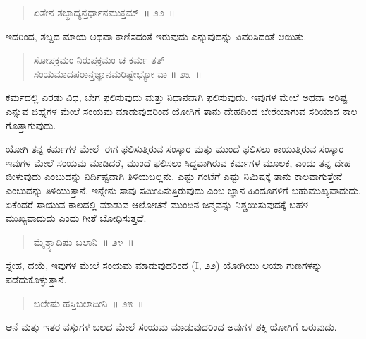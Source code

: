 \vspace{-0.3cm}

\begin{verse}
ಏತೇನ ಶಬ್ಧಾದ್ಯನ್ತರ್ಧಾನಮುಕ್ತಮ್​~॥ ೨೨~॥
\end{verse}

\vspace{-0.3cm}

ಇದರಿಂದ, ಶಬ್ದದ ಮಾಯ ಅಥವಾ ಕಾಣಿಸದಂತೆ ಇರುವುದು ಎನ್ನುವುದನ್ನು ವಿವರಿಸಿದಂತೆ ಆಯಿತು. 

\vspace{-0.3cm}

\begin{verse}
ಸೋಪಕ್ರಮಂ ನಿರುಪಕ್ರಮಂ ಚ ಕರ್ಮ ತತ್​\\ಸಂಯಮಾದಪರಾನ್ತಜ್ಞಾನಮರಿಷ್ಟೇಭ್ಯೋ ವಾ \hfill{॥ ೨೩~॥}
\end{verse}

\vspace{-0.3cm}

ಕರ್ಮದಲ್ಲಿ ಎರಡು ವಿಧ, ಬೇಗ ಫಲಿಸುವುದು ಮತ್ತು ನಿಧಾನವಾಗಿ ಫಲಿಸುವುದು. ಇವುಗಳ ಮೇಲೆ ಅಥವಾ ಅರಿಷ್ಟ ಎನ್ನುವ ಚಿಹ್ನೆಗಳ ಮೇಲೆ ಸಂಯಮ ಮಾಡುವುದರಿಂದ ಯೋಗಿಗೆ ತಾನು ದೇಹದಿಂದ ಬೇರೆಯಾಗುವ ಸರಿಯಾದ ಕಾಲ ಗೊತ್ತಾಗುವುದು. 

ಯೋಗಿ ತನ್ನ ಕರ್ಮಗಳ ಮೇಲೆ–ಈಗ ಫಲಿಸುತ್ತಿರುವ ಸಂಸ್ಕಾರ ಮತ್ತು ಮುಂದೆ ಫಲಿಸಲು ಕಾಯುತ್ತಿರುವ ಸಂಸ್ಕಾರ–ಇವುಗಳ ಮೇಲೆ ಸಂಯಮ ಮಾಡಿದರೆ, ಮುಂದೆ ಫಲಿಸಲು ಸಿದ್ಧವಾಗಿರುವ ಕರ್ಮಗಳ ಮೂಲಕ, ಎಂದು ತನ್ನ ದೇಹ ಬೀಳುವುದು ಎಂಬುದನ್ನು ನಿರ್ದಿಷ್ಟವಾಗಿ ತಿಳಿಯಬಲ್ಲನು. ಎಷ್ಟು ಗಂಟೆಗೆ ಎಷ್ಟು ನಿಮಿಷಕ್ಕೆ ತಾನು ಕಾಲವಾಗುತ್ತೇನೆ ಎಂಬುದನ್ನು ತಿಳಿಯುತ್ತಾನೆ. ಇನ್ನೇನು ಸಾವು ಸಮೀಪಿಸುತ್ತಿರುವುದು ಎಂಬ ಜ್ಞಾನ ಹಿಂದೂಗಳಿಗೆ ಬಹುಮುಖ್ಯವಾದುದು. ಏಕೆಂದರೆ ಸಾಯುವ ಕಾಲದಲ್ಲಿ ಮಾಡುವ ಆಲೋಚನೆ ಮುಂದಿನ ಜನ್ಮವನ್ನು ನಿಶ್ಚಯಿಸುವುದಕ್ಕೆ ಬಹಳ ಮುಖ್ಯವಾದುದು ಎಂದು ಗೀತೆ ಬೋಧಿಸುತ್ತದೆ. 

\vspace{-0.3cm}

\begin{verse}
ಮೈತ್ರ್ಯಾದಿಷು ಬಲಾನಿ~॥ ೨೪~॥
\end{verse}

\vspace{-0.3cm}

ಸ್ನೇಹ, ದಯೆ, ಇವುಗಳ ಮೇಲೆ ಸಂಯಮ ಮಾಡುವುದರಿಂದ (I, ೨೨) ಯೋಗಿಯು ಆಯಾ ಗುಣಗಳನ್ನು ಪಡೆದುಕೊಳ್ಳುತ್ತಾನೆ. 

\vspace{-0.3cm}

\begin{verse}
ಬಲೇಷು ಹಸ್ತಿಬಲಾದೀನಿ~॥ ೨೫~॥
\end{verse}

\vspace{-0.3cm}

ಆನೆ ಮತ್ತು ಇತರ ವಸ್ತುಗಳ ಬಲದ ಮೇಲೆ ಸಂಯಮ ಮಾಡುವುದರಿಂದ ಅವುಗಳ ಶಕ್ತಿ ಯೋಗಿಗೆ ಬರುವುದು. 

